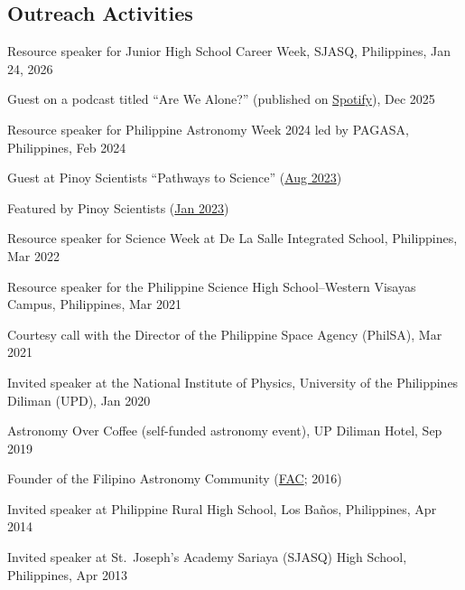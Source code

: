 \documentclass[12pt,letterpaper]{article}
\begin{document}
\subsection{Outreach Activities}
\begin{list}{}{\cvlist}
    \item Resource speaker for Junior High School Career Week, SJASQ, Philippines, Jan 24, 2026
    \item Guest on a podcast titled ``Are We Alone?'' (published on \href{https://open.spotify.com/episode/2hfoLrrP6TKyKE7mgu6pju?trackId=7BRD7x5pt8Lqa1eGYC4dzj}{Spotify}), Dec 2025
    \item Resource speaker for Philippine Astronomy Week 2024 led by PAGASA, Philippines, Feb 2024
    \item Guest at Pinoy Scientists ``Pathways to Science'' (\href{https://pinoyscientists.com/feature/2023-and-me-pinoy-scientists-year-in-review/}{Aug 2023})
    \item Featured by Pinoy Scientists (\href{https://www.facebook.com/pinoyscientists/posts/pfbid0Lj83pJZaaU35tdSpz5UKgkAodhBqMzudUjCS7z4UV32zqiqmkQzT7LdtpGTsu7Cql}{Jan 2023})
    \item Resource speaker for Science Week at De La Salle Integrated School, Philippines, Mar 2022
    \item Resource speaker for the Philippine Science High School--Western Visayas Campus, Philippines, Mar 2021
    \item Courtesy call with the Director of the Philippine Space Agency (PhilSA), Mar 2021
    \item Invited speaker at the National Institute of Physics, University of the Philippines Diliman (UPD), Jan 2020
    \item Astronomy Over Coffee (self-funded astronomy event), UP Diliman Hotel, Sep 2019
    \item Founder of the Filipino Astronomy Community (\href{https://www.facebook.com/groups/filastrocomm}{FAC}; 2016)
    \item Invited speaker at Philippine Rural High School, Los Ba\~nos, Philippines, Apr 2014
    \item Invited speaker at St.\ Joseph's Academy Sariaya (SJASQ) High School, Philippines, Apr 2013
\end{list}


\end{document}
